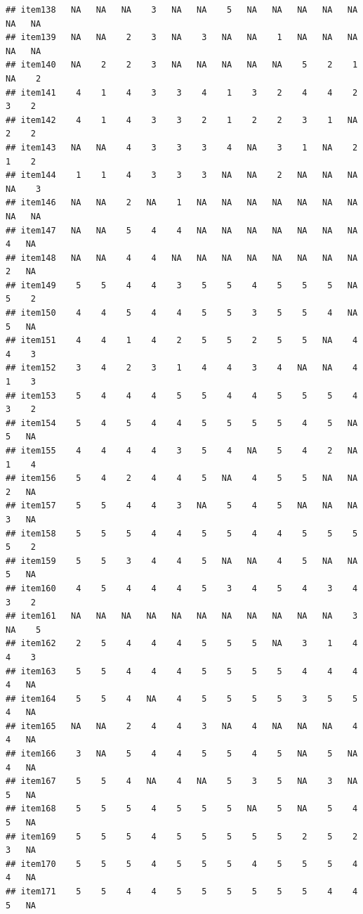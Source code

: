 \documentclass[
  man]{apa6}
\begin{document}
\begin{verbatim}
## item138   NA   NA   NA    3   NA   NA    5   NA   NA   NA   NA   NA   NA   NA
## item139   NA   NA    2    3   NA    3   NA   NA    1   NA   NA   NA   NA   NA
## item140   NA    2    2    3   NA   NA   NA   NA   NA    5    2    1   NA    2
## item141    4    1    4    3    3    4    1    3    2    4    4    2    3    2
## item142    4    1    4    3    3    2    1    2    2    3    1   NA    2    2
## item143   NA   NA    4    3    3    3    4   NA    3    1   NA    2    1    2
## item144    1    1    4    3    3    3   NA   NA    2   NA   NA   NA   NA    3
## item146   NA   NA    2   NA    1   NA   NA   NA   NA   NA   NA   NA   NA   NA
## item147   NA   NA    5    4    4   NA   NA   NA   NA   NA   NA   NA    4   NA
## item148   NA   NA    4    4   NA   NA   NA   NA   NA   NA   NA   NA    2   NA
## item149    5    5    4    4    3    5    5    4    5    5    5   NA    5    2
## item150    4    4    5    4    4    5    5    3    5    5    4   NA    5   NA
## item151    4    4    1    4    2    5    5    2    5    5   NA    4    4    3
## item152    3    4    2    3    1    4    4    3    4   NA   NA    4    1    3
## item153    5    4    4    4    5    5    4    4    5    5    5    4    3    2
## item154    5    4    5    4    4    5    5    5    5    4    5   NA    5   NA
## item155    4    4    4    4    3    5    4   NA    5    4    2   NA    1    4
## item156    5    4    2    4    4    5   NA    4    5    5   NA   NA    2   NA
## item157    5    5    4    4    3   NA    5    4    5   NA   NA   NA    3   NA
## item158    5    5    5    4    4    5    5    4    4    5    5    5    5    2
## item159    5    5    3    4    4    5   NA   NA    4    5   NA   NA    5   NA
## item160    4    5    4    4    4    5    3    4    5    4    3    4    3    2
## item161   NA   NA   NA   NA   NA   NA   NA   NA   NA   NA   NA    3   NA    5
## item162    2    5    4    4    4    5    5    5   NA    3    1    4    4    3
## item163    5    5    4    4    4    5    5    5    5    4    4    4    4   NA
## item164    5    5    4   NA    4    5    5    5    5    3    5    5    4   NA
## item165   NA   NA    2    4    4    3   NA    4   NA   NA   NA    4    4   NA
## item166    3   NA    5    4    4    5    5    4    5   NA    5   NA    4   NA
## item167    5    5    4   NA    4   NA    5    3    5   NA    3   NA    5   NA
## item168    5    5    5    4    5    5    5   NA    5   NA    5    4    5   NA
## item169    5    5    5    4    5    5    5    5    5    2    5    2    3   NA
## item170    5    5    5    4    5    5    5    4    5    5    5    4    4   NA
## item171    5    5    4    4    5    5    5    5    5    5    4    4    5   NA

\end{verbatim}
\end{document}
